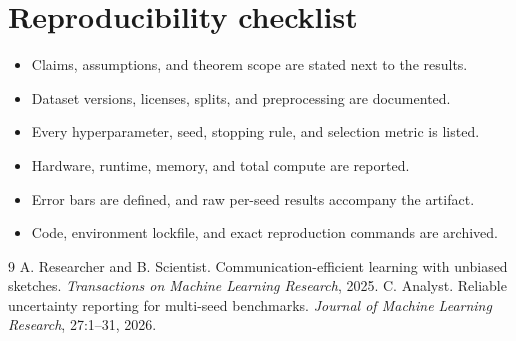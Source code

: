 \documentclass[10pt]{article}
\begin{document}
\section*{Reproducibility checklist}
\begin{itemize}
  \item Claims, assumptions, and theorem scope are stated next to the results.
  \item Dataset versions, licenses, splits, and preprocessing are documented.
  \item Every hyperparameter, seed, stopping rule, and selection metric is listed.
  \item Hardware, runtime, memory, and total compute are reported.
  \item Error bars are defined, and raw per-seed results accompany the artifact.
  \item Code, environment lockfile, and exact reproduction commands are archived.
\end{itemize}

\begin{thebibliography}{9}
 A. Researcher and B. Scientist.
Communication-efficient learning with unbiased sketches.
\textit{Transactions on Machine Learning Research}, 2025.
 C. Analyst.
Reliable uncertainty reporting for multi-seed benchmarks.
\textit{Journal of Machine Learning Research}, 27:1--31, 2026.
\end{thebibliography}
\end{document}
